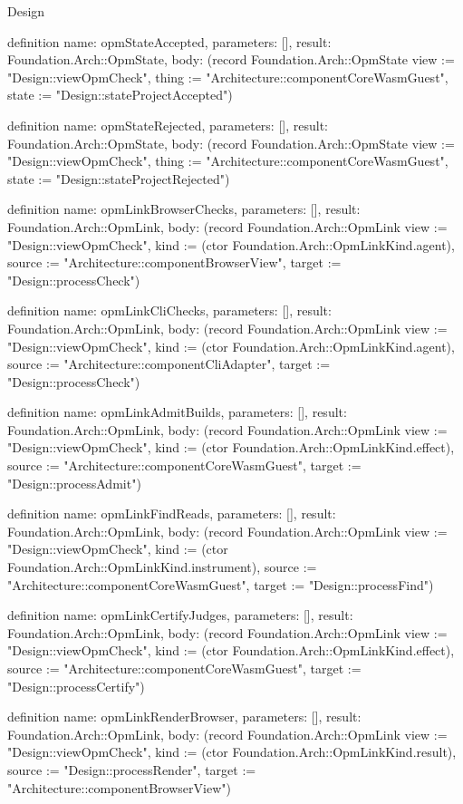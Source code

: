 \begin{lexlean}{Design}
\begin{semanticmodule}
definition{
  name: opmStateAccepted,
  parameters: [],
  result: Foundation.Arch::OpmState,
  body: (record Foundation.Arch::OpmState {view := "Design::viewOpmCheck", thing := "Architecture::componentCoreWasmGuest", state := "Design::stateProjectAccepted"})
}

definition{
  name: opmStateRejected,
  parameters: [],
  result: Foundation.Arch::OpmState,
  body: (record Foundation.Arch::OpmState {view := "Design::viewOpmCheck", thing := "Architecture::componentCoreWasmGuest", state := "Design::stateProjectRejected"})
}

definition{
  name: opmLinkBrowserChecks,
  parameters: [],
  result: Foundation.Arch::OpmLink,
  body: (record Foundation.Arch::OpmLink {view := "Design::viewOpmCheck", kind := (ctor Foundation.Arch::OpmLinkKind.agent), source := "Architecture::componentBrowserView", target := "Design::processCheck"})
}

definition{
  name: opmLinkCliChecks,
  parameters: [],
  result: Foundation.Arch::OpmLink,
  body: (record Foundation.Arch::OpmLink {view := "Design::viewOpmCheck", kind := (ctor Foundation.Arch::OpmLinkKind.agent), source := "Architecture::componentCliAdapter", target := "Design::processCheck"})
}

definition{
  name: opmLinkAdmitBuilds,
  parameters: [],
  result: Foundation.Arch::OpmLink,
  body: (record Foundation.Arch::OpmLink {view := "Design::viewOpmCheck", kind := (ctor Foundation.Arch::OpmLinkKind.effect), source := "Architecture::componentCoreWasmGuest", target := "Design::processAdmit"})
}

definition{
  name: opmLinkFindReads,
  parameters: [],
  result: Foundation.Arch::OpmLink,
  body: (record Foundation.Arch::OpmLink {view := "Design::viewOpmCheck", kind := (ctor Foundation.Arch::OpmLinkKind.instrument), source := "Architecture::componentCoreWasmGuest", target := "Design::processFind"})
}

definition{
  name: opmLinkCertifyJudges,
  parameters: [],
  result: Foundation.Arch::OpmLink,
  body: (record Foundation.Arch::OpmLink {view := "Design::viewOpmCheck", kind := (ctor Foundation.Arch::OpmLinkKind.effect), source := "Architecture::componentCoreWasmGuest", target := "Design::processCertify"})
}

definition{
  name: opmLinkRenderBrowser,
  parameters: [],
  result: Foundation.Arch::OpmLink,
  body: (record Foundation.Arch::OpmLink {view := "Design::viewOpmCheck", kind := (ctor Foundation.Arch::OpmLinkKind.result), source := "Design::processRender", target := "Architecture::componentBrowserView"})
}


\end{semanticmodule}
\end{lexlean}
